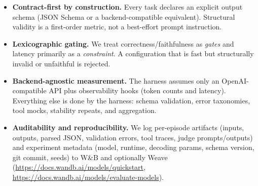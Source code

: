 \documentclass[11pt]{article}
\begin{document}
\begin{itemize}[leftmargin=12pt]
    \item \textbf{Contract-first by construction.} Every task declares an explicit output schema (JSON Schema or a backend-compatible equivalent). Structural validity is a first-order metric, not a best-effort prompt instruction.
    \item \textbf{Lexicographic gating.} We treat correctness/faithfulness as \emph{gates} and latency primarily as a \emph{constraint}. A configuration that is fast but structurally invalid or unfaithful is rejected.
    \item \textbf{Backend-agnostic measurement.} The harness assumes only an OpenAI-compatible API plus observability hooks (token counts and latency). Everything else is done by the harness: schema validation, error taxonomies, tool mocks, stability repeats, and aggregation.
    \item \textbf{Auditability and reproducibility.} We log per-episode artifacts (inputs, outputs, parsed JSON, validation errors, tool traces, judge prompts/outputs) and experiment metadata (model, runtime, decoding params, schema version, git commit, seeds) to W\&B and optionally Weave (\url{https://docs.wandb.ai/models/quickstart}, \url{https://docs.wandb.ai/models/evaluate-models}).
\end{itemize}
\end{document}
